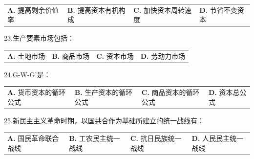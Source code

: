 \documentclass[UTF8,11pt]{ctexart}
\begin{document}
\begin{center}\begin{tabular}{>{\raggedright\arraybackslash}p{\dimexpr(\linewidth-8\tabcolsep)/4\relax}>{\raggedright\arraybackslash}p{\dimexpr(\linewidth-8\tabcolsep)/4\relax}>{\raggedright\arraybackslash}p{\dimexpr(\linewidth-8\tabcolsep)/4\relax}>{\raggedright\arraybackslash}p{\dimexpr(\linewidth-8\tabcolsep)/4\relax}}
\textbf{A.} 提高剩余价值率 & \textbf{B.} 提高资本有机构成 & \textbf{C.} 加快资本周转速度 & \textbf{D.} 节省不变资本\\[.35em]\end{tabular}\end{center}

23.生产要素市场包括：


\begin{center}\begin{tabular}{>{\raggedright\arraybackslash}p{\dimexpr(\linewidth-8\tabcolsep)/4\relax}>{\raggedright\arraybackslash}p{\dimexpr(\linewidth-8\tabcolsep)/4\relax}>{\raggedright\arraybackslash}p{\dimexpr(\linewidth-8\tabcolsep)/4\relax}>{\raggedright\arraybackslash}p{\dimexpr(\linewidth-8\tabcolsep)/4\relax}}
\textbf{A.} 土地市场 & \textbf{B.} 商品市场 & \textbf{C.} 资本市场 & \textbf{D.} 劳动力市场\\[.35em]\end{tabular}\end{center}

24.G-W-G’是：


\begin{center}\begin{tabular}{>{\raggedright\arraybackslash}p{\dimexpr(\linewidth-8\tabcolsep)/4\relax}>{\raggedright\arraybackslash}p{\dimexpr(\linewidth-8\tabcolsep)/4\relax}>{\raggedright\arraybackslash}p{\dimexpr(\linewidth-8\tabcolsep)/4\relax}>{\raggedright\arraybackslash}p{\dimexpr(\linewidth-8\tabcolsep)/4\relax}}
\textbf{A.} 货币资本的循环公式 & \textbf{B.} 生产资本的循环公式 & \textbf{C.} 商品资本的循环公式 & \textbf{D.} 资本总公式\\[.35em]\end{tabular}\end{center}

25.新民主主义革命时期，以国共合作为基础所建立的统一战线有：


\begin{center}\begin{tabular}{>{\raggedright\arraybackslash}p{\dimexpr(\linewidth-8\tabcolsep)/4\relax}>{\raggedright\arraybackslash}p{\dimexpr(\linewidth-8\tabcolsep)/4\relax}>{\raggedright\arraybackslash}p{\dimexpr(\linewidth-8\tabcolsep)/4\relax}>{\raggedright\arraybackslash}p{\dimexpr(\linewidth-8\tabcolsep)/4\relax}}
\textbf{A.} 国民革命联合战线 & \textbf{B.} 工农民主统一战线 & \textbf{C.} 抗日民族统一战线 & \textbf{D.} 人民民主统一战线\\[.35em]\end{tabular}\end{center}
\end{document}
